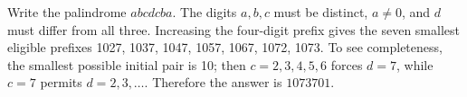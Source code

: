 Write the palindrome $abcdcba$. The digits $a,b,c$ must be distinct, $a\ne0$, and $d$ must differ from all three. Increasing the four-digit prefix gives the seven smallest eligible prefixes 1027, 1037, 1047, 1057, 1067, 1072, 1073. To see completeness, the smallest possible initial pair is 10; then $c=2,3,4,5,6$ forces $d=7$, while $c=7$ permits $d=2,3,\ldots$. Therefore the answer is $\boxed{1073701}$.
